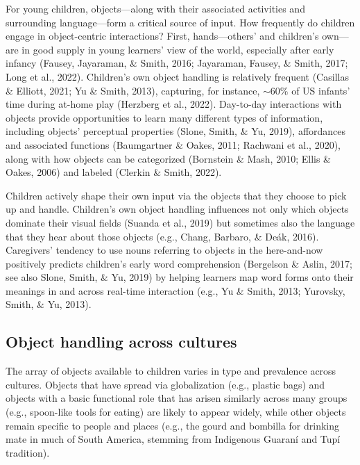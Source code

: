\documentclass[10pt, letterpaper]{article}
\begin{document}
For young children, objects---along with their associated activities and
surrounding language---form a critical source of input. How frequently
do children engage in object-centric interactions? First,
hands---others' and children's own---are in good supply in young
learners' view of the world, especially after early infancy (Fausey,
Jayaraman, \& Smith, 2016; Jayaraman, Fausey, \& Smith, 2017; Long et
al., 2022). Children's own object handling is relatively frequent
(Casillas \& Elliott, 2021; Yu \& Smith, 2013), capturing, for instance,
\({\sim}60\%\) of US infants' time during at-home play (Herzberg et al.,
2022). Day-to-day interactions with objects provide opportunities to
learn many different types of information, including objects' perceptual
properties (Slone, Smith, \& Yu, 2019), affordances and associated
functions (Baumgartner \& Oakes, 2011; Rachwani et al., 2020), along
with how objects can be categorized (Bornstein \& Mash, 2010; Ellis \&
Oakes, 2006) and labeled (Clerkin \& Smith, 2022).

Children actively shape their own input via the objects that they choose
to pick up and handle. Children's own object handling influences not
only which objects dominate their visual fields (Suanda et al., 2019)
but sometimes also the language that they hear about those objects
(e.g., Chang, Barbaro, \& Deák, 2016). Caregivers' tendency to use nouns
referring to objects in the here-and-now positively predicts children's
early word comprehension (Bergelson \& Aslin, 2017; see also Slone,
Smith, \& Yu, 2019) by helping learners map word forms onto their
meanings in and across real-time interaction (e.g., Yu \& Smith, 2013;
Yurovsky, Smith, \& Yu, 2013).

\hypertarget{object-handling-across-cultures}{%
\subsection{Object handling across
cultures}\label{object-handling-across-cultures}}

The array of objects available to children varies in type and prevalence
across cultures. Objects that have spread via globalization (e.g.,
plastic bags) and objects with a basic functional role that has arisen
similarly across many groups (e.g., spoon-like tools for eating) are
likely to appear widely, while other objects remain specific to people
and places (e.g., the gourd and bombilla for drinking mate in much of
South America, stemming from Indigenous Guaraní and Tupí tradition).
\end{document}
